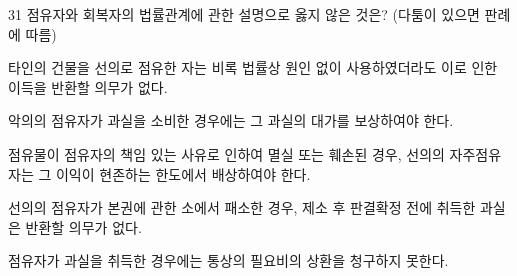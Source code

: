 \begin{question}{31}
점유자와 회복자의 법률관계에 관한 설명으로 옳지 않은 것은? (다툼이 있으면 판례에 따름)
\begin{choices}
  \item 타인의 건물을 선의로 점유한 자는 비록 법률상 원인 없이 사용하였더라도 이로 인한 이득을 반환할 의무가 없다.
  \item 악의의 점유자가 과실을 소비한 경우에는 그 과실의 대가를 보상하여야 한다.
  \item 점유물이 점유자의 책임 있는 사유로 인하여 멸실 또는 훼손된 경우, 선의의 자주점유자는 그 이익이 현존하는 한도에서 배상하여야 한다.
  \item 선의의 점유자가 본권에 관한 소에서 패소한 경우, 제소 후 판결확정 전에 취득한 과실은 반환할 의무가 없다.
  \item 점유자가 과실을 취득한 경우에는 통상의 필요비의 상환을 청구하지 못한다.
\end{choices}
\end{question}
